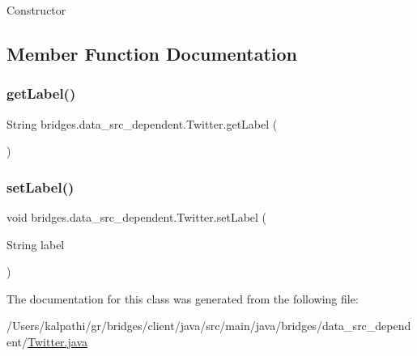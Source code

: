 Constructor 

\subsection{Member Function Documentation}
\mbox{\label{classbridges_1_1data__src__dependent_1_1_twitter_ac7d7ac0808192702bc4a1a790237da8b}} 
\subsubsection{\texorpdfstring{get\+Label()}{getLabel()}}
{\footnotesize\ttfamily String bridges.\+data\+\_\+src\+\_\+dependent.\+Twitter.\+get\+Label (\begin{DoxyParamCaption}{ }\end{DoxyParamCaption})}

\mbox{\label{classbridges_1_1data__src__dependent_1_1_twitter_a4d7d3a015d66029f373d5c8e41659242}} 
\subsubsection{\texorpdfstring{set\+Label()}{setLabel()}}
{\footnotesize\ttfamily void bridges.\+data\+\_\+src\+\_\+dependent.\+Twitter.\+set\+Label (\begin{DoxyParamCaption}\item[{String}]{label }\end{DoxyParamCaption})}



The documentation for this class was generated from the following file\+:\begin{DoxyCompactItemize}
\item 
/\+Users/kalpathi/gr/bridges/client/java/src/main/java/bridges/data\+\_\+src\+\_\+dependent/\mbox{\hyperlink{_twitter_8java}{Twitter.\+java}}\end{DoxyCompactItemize}
